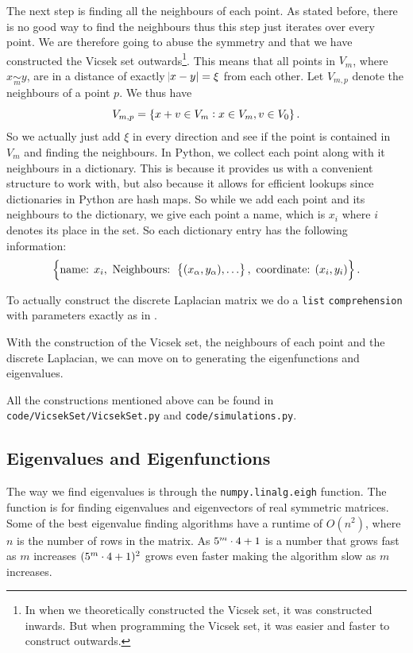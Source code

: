 The next step is finding all the neighbours of each point. As stated before, there is no good way to find the neighbours thus this step just iterates over every point. We are therefore going to abuse the symmetry and  that we have constructed the Vicsek set outwards\footnote{In  when we theoretically constructed the Vicsek set, it was constructed inwards. But when programming the Vicsek set, it was easier and faster to construct outwards.}. This means that all points in $V_m$, where $x \underset{m}{\sim} y$, are in a distance of exactly $\abs{x - y} = \xi$ from each other.
Let $V_{m,p}$ denote the neighbours of a point $p$. We thus have
\begin{equation}
	V_{m,p} = \cbr{x + v \in V_m : x \in V_m, v \in V_0}.
\end{equation}
So we actually just add $\xi$ in every direction and see if the point is contained in $V_m$ and finding the neighbours. In Python, we collect each point along with it neighbours in a dictionary. This is because it provides us with a convenient structure to work with, but also because it allows for efficient lookups since dictionaries in Python are hash maps. So while we add each point and its neighbours to the dictionary, we give each point a name, which is $x_i$ where $i$ denotes its place in the set. So each dictionary entry has the following information: 
\begin{equation}
	\cbr{\text{name: }x_i, \text{ Neighbours: } \cbr{(x_\alpha, y_{\alpha}),\ldots }, \text{ coordinate: } (x_i, y_i)}.
\end{equation}

To actually construct the discrete Laplacian matrix we do a \verb|list| \verb|comprehension| with parameters exactly as in . 

With the construction of the Vicsek set, the neighbours of each point and the discrete Laplacian, we can move on to generating the eigenfunctions and eigenvalues.

All the constructions mentioned above can be found in \verb*|code/VicsekSet/VicsekSet.py| and \verb*|code/simulations.py|.

\subsection{Eigenvalues and Eigenfunctions}
The way we find eigenvalues is through the \verb*|numpy.linalg.eigh| function. The function is for finding eigenvalues and eigenvectors of real symmetric matrices. Some of the best eigenvalue finding algorithms have a runtime of $O(n^2)$, where $n$ is the number of rows in the matrix. As $5^{m}\cdot 4 +1$ is a number that grows fast as $m$ increases $(5^{m}\cdot 4 +1)^2$ grows even faster making the algorithm slow as $m$ increases.

